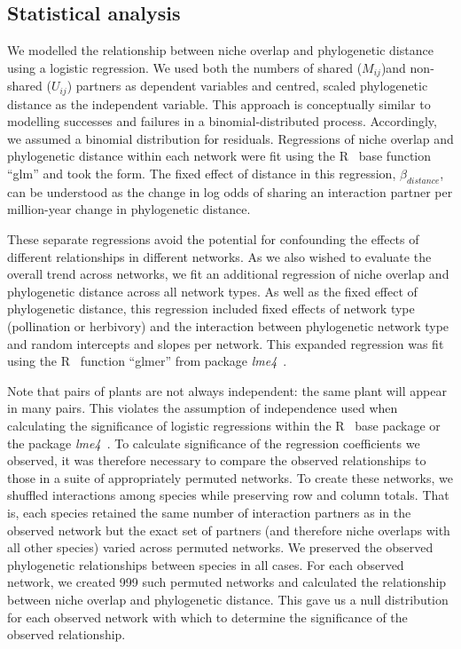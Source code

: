 \documentclass[12pt]{article}
\begin{document}
\begin{spacing}{1.5}
\subsection*{Statistical analysis} 

  We modelled the relationship between niche overlap and phylogenetic distance
  using a logistic regression. We used both the numbers of shared ($M_{ij}$)and 
  non-shared ($U_{ij}$) partners as dependent variables and centred, scaled phylogenetic 
  distance as the independent variable. This approach is conceptually similar to 
  modelling successes and failures in a binomial-distributed process. 
  Accordingly, we assumed a binomial distribution for residuals. Regressions of
  niche overlap and phylogenetic distance within each network were fit using the
  R~\citep{R} base function ``glm'' and took the form. The fixed effect of distance
  in this regression, $\beta_{distance}$, can
  be understood as the change in log odds of sharing an interaction partner per
  million-year change in phylogenetic distance. 


  These separate regressions avoid the potential
  for confounding the effects of different relationships in different networks. As
  we also wished to evaluate the overall trend across networks, we fit an additional
  regression of niche overlap and phylogenetic distance across all network types.
  As well as the fixed effect of phylogenetic distance, this regression included 
  fixed effects of network type (pollination or herbivory) and the interaction 
  between phylogenetic network type and random intercepts and slopes per network.
  This expanded regression was fit using the R~\citep{R} function ``glmer'' from
  package \emph{lme4}~\citep{lme4}.


  Note that pairs of plants are not always independent: the same plant will
  appear in many pairs. This violates the assumption of independence used when 
  calculating the significance of logistic regressions within the R~\citep{R} 
  base package or the package \emph{lme4}~\citep{lme4}. To calculate significance 
  of the regression coefficients we observed, it was therefore necessary to compare the 
  observed relationships to those in a suite of appropriately permuted networks. To create 
  these networks, we shuffled interactions among species while preserving row 
  and column totals. That is, each species retained the same number of 
  interaction partners as in the observed network but the exact set of 
  partners (and therefore niche overlaps with all other species) varied across 
  permuted networks. We preserved the observed phylogenetic relationships 
  between species in all cases. For each observed network, we created 999 such 
  permuted networks and calculated the relationship between niche overlap and 
  phylogenetic distance. This gave us a null distribution for each observed 
  network with which to determine the significance of the observed 
  relationship.



\end{spacing}
\end{document}
